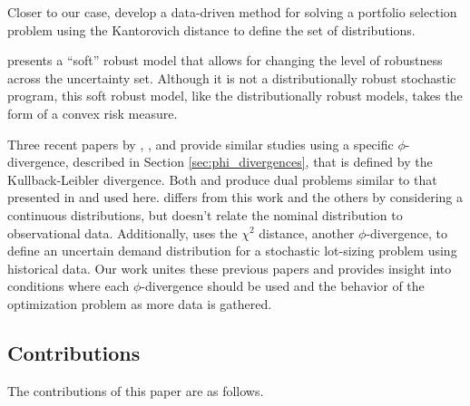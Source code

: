 \documentclass[opre,nonblindrev]{informs3} %
\begin{document}
Closer to our case, \citet{pflug2007ambiguity} develop a data-driven method for solving a portfolio selection problem using the Kantorovich distance to define the set of distributions.

\citet{bental2010soft} presents a ``soft'' robust model that allows for changing the level of robustness across the uncertainty set.
Although it is not a distributionally robust stochastic program, this soft robust model, like the distributionally robust models, takes the form of a convex risk measure.

Three recent papers by \citet{wang2010likelihood}, \citet{calafiore2007ambiguous}, and \citet{hukullback} provide similar studies using a specific $\phi$-divergence, described in Section \ref{sec:phi_divergences}, that is defined by the Kullback-Leibler divergence.
Both \citep{wang2010likelihood} and \citep{hukullback} produce dual problems similar to that presented in \citep{bental2011robust} and used here.
\citet{hukullback} differs from this work and the others by considering a continuous distributions, but doesn't relate the nominal distribution to observational data.
Additionally, \citet{klabjan2013robust} uses the $\chi^2$ distance, another $\phi$-divergence, to define an uncertain demand distribution for a stochastic lot-sizing problem using historical data.
Our work unites these previous papers and provides insight into conditions where each $\phi$-divergence should be used and the behavior of the optimization problem as more data is gathered.

\subsection{Contributions}

The contributions of this paper are as follows. 
\end{document}
